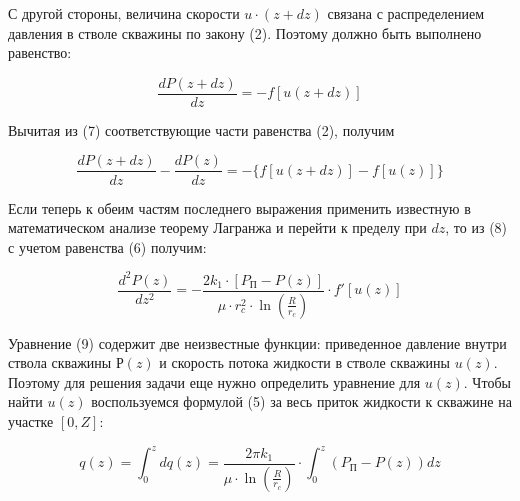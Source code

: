 С другой стороны, величина скорости $u\cdot(z+dz)$ связана с
распределением давления в стволе скважины по закону (2). Поэтому должно
быть выполнено равенство:

\begin{equation}
\frac{dP(z+dz)}{dz}=-f[u(z+dz)]
\end{equation}

Вычитая из (7) соответствующие части равенства (2), получим

\begin{equation}
\frac{dP(z+dz)}{dz}-\frac{dP(z)}{dz}=-\{f[u(z+dz)]-f[u(z)]\}
\end{equation}

Если теперь к обеим частям последнего выражения применить известную в
математическом анализе теорему Лагранжа и перейти к пределу при
$dz$, то из (8) с учетом равенства (6) получим:

\begin{equation}
\frac{d^2P(z)}{dz^2}=-\frac{2k_1\cdot[P_{\text{П}}-P(z)]}{\mu\cdot r_c^2\cdot \ln\left(\frac{R}{r_c}\right)}\cdot f'[u(z)]
\end{equation}

Уравнение (9) содержит две неизвестные функции: приведенное давление
внутри ствола скважины $Р(z)$ и скорость потока жидкости в стволе
скважины $u(z)$. Поэтому для решения задачи еще нужно определить
уравнение для $u(z)$. Чтобы найти $u(z)$ воспользуемся
формулой (5) за весь приток жидкости к скважине на участке $[0,Z]$:

\begin{equation}
q(z)=\int_0^z dq(z)=\frac{2\pi k_1}{\mu\cdot\ln\left(\frac{R}{r_c}\right)}\cdot\int_0^z(P_{\text{П}}-P(z))dz
\end{equation}

